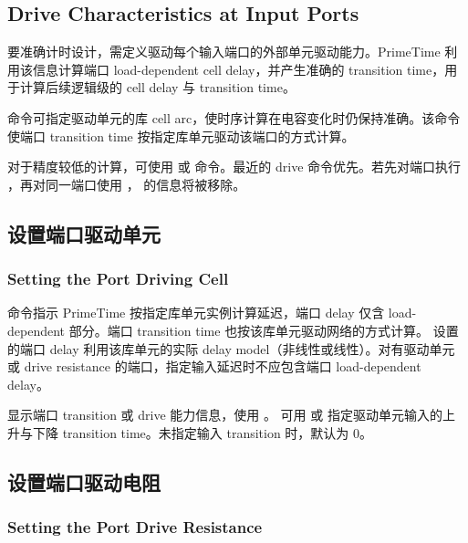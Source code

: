 \subsection*{Drive Characteristics at Input Ports}

要准确计时设计，需定义驱动每个输入端口的外部单元驱动能力。PrimeTime 利用该信息计算端口 load-dependent cell delay，并产生准确的 transition time，用于计算后续逻辑级的 cell delay 与 transition time。


 命令可指定驱动单元的库 cell arc，使时序计算在电容变化时仍保持准确。该命令使端口 transition time 按指定库单元驱动该端口的方式计算。

对于精度较低的计算，可使用  或  命令。最近的 drive 命令优先。若先对端口执行 ，再对同一端口使用 ， 的信息将被移除。

\subsection{设置端口驱动单元}
\subsubsection*{Setting the Port Driving Cell}

 命令指示 PrimeTime 按指定库单元实例计算延迟，端口 delay 仅含 load-dependent 部分。端口 transition time 也按该库单元驱动网络的方式计算。 设置的端口 delay 利用该库单元的实际 delay model（非线性或线性）。对有驱动单元或 drive resistance 的端口，指定输入延迟时不应包含端口 load-dependent delay。

显示端口 transition 或 drive 能力信息，使用 。 可用  或  指定驱动单元输入的上升与下降 transition time。未指定输入 transition 时，默认为 0。

\subsection{设置端口驱动电阻}
\subsubsection*{Setting the Port Drive Resistance}

